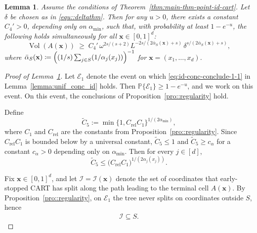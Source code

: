 \documentclass[11pt]{article}
\theoremstyle{plain}
\newtheorem{lemma}[theorem]{Lemma}
\theoremstyle{definition}
\theoremstyle{remark}
\theoremstyle{plain}
\newcommand{\bx}{\mathbf{x}}
\DeclarePairedDelimiter{\paren}{(}{)}
\renewcommand{\P}{\mathbb{P}}
\DeclareMathOperator{\Vol}{Vol}
\newcommand{\1}{\mathbbm{1}}
\begin{document}
\begin{lemma}\label{lem::convarlowerbound}
Assume the conditions of Theorem~\ref{thm:main-thm-point-id-cart}.
Let $\delta$ be chosen as in \eqref{equ::deltathm}.
Then for any $u>0$, there exists a constant $C_4'>0$, depending only on $\alpha_{\min}$, such that, with probability at least $1-e^{-u}$, the following holds
simultaneously for all $\bx\in[0,1]^d$:
\[
\Vol(A(\bx))
\;\ge\;
C_4'\,
\omega^{2s/(s+2)}
L^{-2s/(2\bar\alpha_S(\bx)+s)}\,
\delta^{s/(2\bar\alpha_S(\bx)+s)},
\]
where $\bar\alpha_S(\bx)\coloneqq \paren*{(1/s)\sum_{j\in S}(1/\alpha_j(x_j))}^{-1}$ for $\bx=(x_1,\ldots,x_d)$.
\end{lemma}

\begin{proof}[Proof of Lemma~\ref{lem::convarlowerbound}]
Let $\mathcal{E}_1$ denote the event on which 
\eqref{eq:id-conc-conclude-1-1} in 
Lemma~\ref{lemma:unif_conc_id} holds.
Then $\P\{\mathcal{E}_1\} \ge 1 - e^{-u}$, and we work on this event.
On this event, the conclusions of Proposition~\ref{pro::regularity} hold.

Define
\begin{equation}
\widetilde C_5
:=
\min\{1,C_{\mathrm{rel}}C_1\}^{1/(2\alpha_{\min})},
\end{equation}
where $C_1$ and $C_{\mathrm{rel}}$ are the constants from Proposition~\ref{pro::regularity}.
Since $C_{\mathrm{rel}}C_1$ is bounded below by a universal constant, $\widetilde C_5\le1$ and $\widetilde C_5\ge c_\alpha$ for a constant $c_\alpha>0$ depending only on $\alpha_{\min}$.
Then for every $j\in[d]$,
\begin{equation}\label{eq:C6choice}
\widetilde C_5
\le
\bigl(C_{\mathrm{rel}}C_1\bigr)^{1/(2\alpha_j(x_j))} .
\end{equation}

Fix $\bx\in[0,1]^d$, and let $\mathcal I=\mathcal I(\bx)$ denote the set of coordinates
that early-stopped CART has split along the path leading to the terminal cell $A(\bx)$.
By Proposition~\ref{pro::regularity}, on $\mathcal E_1$ the tree never splits
on coordinates outside $S$, hence
\begin{align}\label{equ::isubsets}
\mathcal I\subseteq S.
\end{align}


\end{proof}
\end{document}
